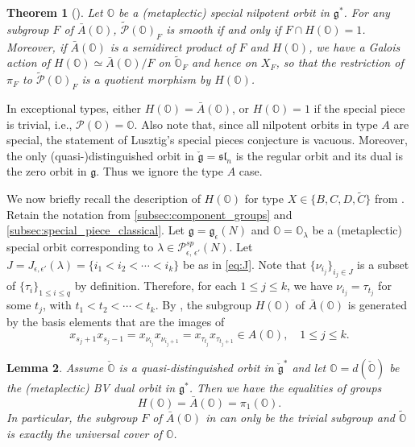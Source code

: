 \documentclass[11pt, a4paper]{amsart}
\newcommand{\g}{\mathfrak{g}}
\newcommand{\orb}{\mathbb{O}}
\newcommand{\fg}{\mathfrak{g}}
\newcommand{\ckfg}{{\check{\fg}}}
\newcommand{\ckorb}{\check{\orb}}
\newcommand{\cP}{\mathcal{P}}
\newcommand{\Abar}{\bar{A}}
\newcommand{\mC}{\widetilde{C}}
\newcommand{\Pee}{\cP^{sp}_{\epsilon,\,\epsilon'}}
\newtheorem{Thm}{Theorem}[subsection]
\newtheorem{Lem}[Thm]{Lemma}
\theoremstyle{definition}
\numberwithin{equation}{section}
\begin{document}
\begin{Thm}[\cite{JLSY:SpecialPiece}] \label{thm:special_piece}
	Let $\orb$ be a (metaplectic) special nilpotent orbit in $\fg^*$. For any subgroup $F$ of $\Abar(\orb)$, $\tilde{\cP}(\orb)_F$ is smooth if and only if $F \cap H(\orb) = 1$. Moreover, if $\Abar(\orb)$ is a semidirect product of $F$ and $H(\orb)$, we have a Galois action of $H(\orb) \simeq \Abar(\orb)/F$ on $\widetilde{\orb}_F$ and hence on $X_F$, so that the restriction of $\pi_F$ to $\tilde{\cP}(\orb)_F$ is a quotient morphism by $H(\orb)$.
\end{Thm}

In exceptional types, either $H(\orb) = \Abar(\orb)$, or $H(\orb) = 1$ if the special piece is trivial, i.e., $\cP(\orb) = \orb$. Also note that, since all nilpotent orbits in type $A$ are special, the statement of Lusztig's special pieces conjecture is vacuous. Moreover, the only (quasi-)distinguished orbit in $\ckfg = \mathfrak{sl}_n$ is the regular orbit and its dual is the zero orbit in $\g$. Thus we ignore the type $A$ case. 

We now briefly recall the description of $H(\orb)$ for type $X \in \{B, C, D, \mC\}$ from \cite{JLSY:SpecialPiece}.
Retain the notation from \cref{subsec:component_groups} and \cref{subsec:special_piece_classical}. Let $\g = \g_\epsilon(N)$ and $\orb = \orb_\lambda$ be a (metaplectic) special orbit corresponding to $\lambda \in \Pee(N)$.
Let $J = J_{\epsilon,\epsilon'}(\lambda) = \{ i_1<i_2<\cdots <i_k\}$ be as in \eqref{eq:J}. Note that $\{ \nu_{i_j} \}_{i_j \in J}$ is a subset of $\{ \tau_i \}_{1 \leqslant i \leqslant q}$ by definition. Therefore, for each $1 \leqslant j \leqslant k$, we have $\nu_{i_j} = \tau_{t_j}$ for some $t_j$, with $t_1 < t_2 < \cdots < t_k$. By \cite[Corollary 1.9]{JLSY:SpecialPiece}, the subgroup $H(\orb)$ of $\Abar(\orb)$ is generated by the basis elements that are the images of 
\begin{equation}\label{eq:H(orb)_generator}
	x_{s_j+1} x_{s_j-1} = x_{\nu_{i_j}} x_{\nu_{i_j + 1}} = x_{\tau_{t_j}} x_{\tau_{t_j + 1}} \in A(\orb), \quad 1 \leqslant j \leqslant k.
\end{equation}


\begin{Lem}\label{lem:H_quasi-dist}
	Assume $\ckorb$ is a quasi-distinguished orbit in $\ckfg^*$ and let $\orb = d(\ckorb)$ be the (metaplectic) BV dual orbit in $\fg^*$. Then we have the equalities of groups
		\[ H(\orb) = \Abar(\orb) = \pi_1(\orb).\] 
	In particular, the subgroup $F$ of $\Abar(\orb)$ in  can only be the trivial subgroup and $\widetilde{\orb}$ is exactly the universal cover of $\orb$.
\end{Lem}
\end{document}
